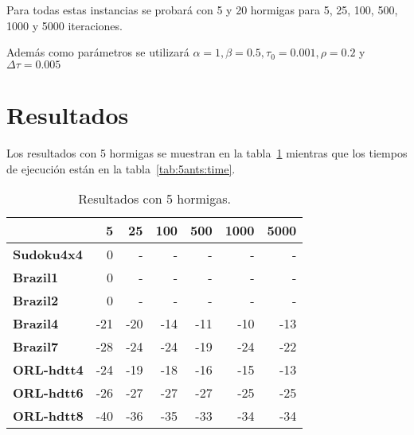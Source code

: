 \documentclass[letter, 10pt]{article}
\renewcommand{\bf}[1]{\textbf{#1}}
\begin{document}
Para todas estas instancias se probará con 5 y 20 hormigas para 5, 25, 100,
500, 1000 y 5000 iteraciones.

Además como parámetros se utilizará $\alpha = 1, \beta = 0.5, \tau_0 = 0.001,
\rho = 0.2$ y $\Delta\tau = 0.005$

\section{Resultados}\label{sec:res}
Los resultados con 5 hormigas se muestran en la tabla~\ref{tab:5ants} mientras
que los tiempos de ejecución están en la tabla~\ref{tab:5ants:time}.

\begin{table}[h]
\centering
\begin{tabular}{|l|r|r|r|r|r|r|}
  \hline
                 & 5   & 25  & 100 & 500 & 1000 & 5000  \\\hline
  \bf{Sudoku4x4} & 0   & -   & -   & -   & -    & -     \\\hline
  \bf{Brazil1}   & 0   & -   & -   & -   & -    & -     \\\hline
  \bf{Brazil2}   & 0   & -   & -   & -   & -    & -     \\\hline
  \bf{Brazil4}   & -21 & -20 & -14 & -11 & -10  & -13   \\\hline
  \bf{Brazil7}   & -28 & -24 & -24 & -19 & -24  & -22   \\\hline
  \bf{ORL-hdtt4} & -24 & -19 & -18 & -16 & -15  & -13   \\\hline
  \bf{ORL-hdtt6} & -26 & -27 & -27 & -27 & -25  & -25   \\\hline
  \bf{ORL-hdtt8} & -40 & -36 & -35 & -33 & -34  & -34   \\\hline
\end{tabular}
\caption{Resultados con 5 hormigas.}\label{tab:5ants}
\end{table}
\end{document}
